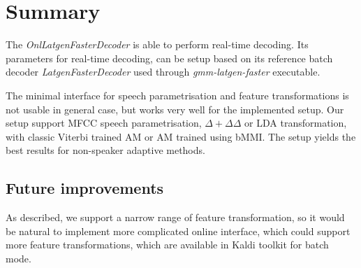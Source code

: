 






\section{Summary}
\label{sec:onl_summary}
The {\it OnlLatgenFasterDecoder}\/ is able to perform real-time decoding.
Its parameters for real-time decoding, 
can be setup based on its reference batch decoder {\it LatgenFasterDecoder}\/ used through {\it gmm-latgen-faster}\/ executable.

The minimal interface for speech parametrisation and feature transformations is not usable in general case,
but works very well for the implemented setup.
Our setup support \ac{MFCC} speech parametrisation, $\Delta+\Delta\Delta$ or \ac{LDA} transformation, with
classic Viterbi trained \ac{AM} or \ac{AM} trained using \ac{bMMI}.
The setup yields the best results for non-speaker adaptive methods.

\subsection{Future improvements}
\label{sub:onl_future}
As described, we support a narrow range of feature transformation,
so it would be natural to implement more complicated online interface,
which could support more feature transformations, 
which are available in Kaldi toolkit for batch mode. 

